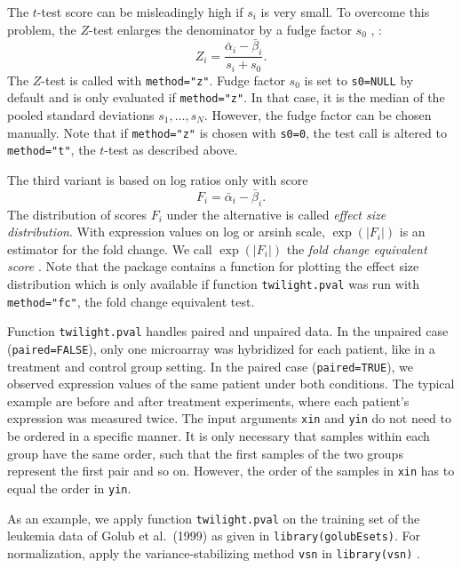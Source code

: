 \documentclass[11pt,a4paper,fleqn]{report}
\newcommand{\Rfunction}[1]{{\texttt{#1}}}
\newcommand{\Rfunarg}[1]{{\texttt{#1}}}
\begin{document}
The $t$-test score can be misleadingly high if $s_i$ is very small. To overcome this problem, the $Z$-test enlarges the denominator by a fudge factor $s_0$ \cite{tusher01}, \cite{efron01}:
\begin{equation}
  Z_i=\frac{\bar \alpha_i - \bar \beta_i}{s_i + s_0}.
\end{equation}
The $Z$-test is called with \Rfunarg{method="z"}. Fudge factor $s_0$ is set to \Rfunarg{s0=NULL} by default and is only evaluated if \Rfunarg{method="z"}. In that case, it is the median of the pooled standard deviations $s_1,\dots,s_N$. However, the fudge factor can be chosen manually. Note that if \Rfunarg{method="z"} is chosen with \Rfunarg{s0=0}, the test call is altered to \Rfunarg{method="t"}, the $t$-test as described above.

The third variant is based on log ratios only with score
\begin{equation}
  F_i=\bar \alpha_i - \bar \beta_i.
\end{equation}
The distribution of scores $F_i$ under the alternative is called \textit{effect size distribution}. With expression values on log or arsinh scale, $\exp (|F_i|)$ is an estimator for the fold change. We call $\exp (|F_i|)$ the \textit{fold change equivalent score} \cite{scheid04}. Note that the package contains a function for plotting the effect size distribution which is only available if function \Rfunction{twilight.pval} was run with \Rfunarg{method="fc"}, the fold change equivalent test.

Function \Rfunction{twilight.pval} handles paired and unpaired data. In the unpaired case (\Rfunarg{paired=FALSE}), only one microarray was hybridized for each patient, like in a treatment and control group setting. In the paired case (\Rfunarg{paired=TRUE}), we observed expression values of the same patient under both conditions. The typical example are before and after treatment experiments, where each patient's expression was measured twice. %
       The input arguments \Rfunarg{xin} and \Rfunarg{yin} do not need to be ordered in a specific manner. It is only necessary that samples within each group have the same order, such that the first samples of the two groups represent the first pair and so on. However, the order of the samples in \Rfunarg{xin} has to equal the order in \Rfunarg{yin}.
       
As an example, we apply function \Rfunction{twilight.pval} on the training set of the leukemia data of Golub et al.~(1999) \cite{golub99} as given in \Rfunction{library(golubEsets)}. For normalization, apply the variance-stabilizing method \Rfunction{vsn} in \Rfunction{library(vsn)} \cite{huber02}.
\begin{Schunk}
\end{Schunk}
\end{document}
